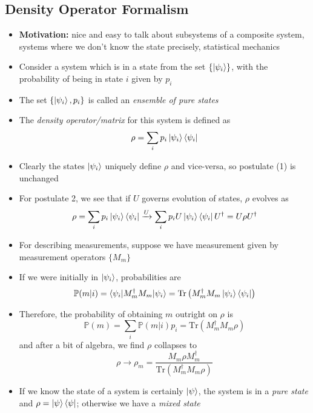 \documentclass[12pt,a4paper]{article}
\numberwithin{equation}{section}
\newcommand{\ketbra}[2]{\ket{#1}\bra{#2}}
\newcommand{\ketbras}[1]{\ketbra{#1}{#1}}
\begin{document}
	\subsection{Density Operator Formalism}
	\begin{itemize}
		\item \textbf{Motivation:} nice and easy to talk about subsystems of a composite system, systems where we don't know the state precisely, statistical mechanics
		\item Consider a system which is in a state from the set $\{\ket{\psi_{i}}\}$, with the probability of being in state $i$ given by $p_{i}$
		\item The set $\{\ket{\psi_{i}},p_{i}\}$ is called an \textit{ensemble of pure states}
		\item The \textit{density operator/matrix} for this system is defined as
		\begin{equation} \label{Density operator}
			\rho=\sum_{i}p_{i}\ket{\psi_{i}}\bra{\psi_{i}}
		\end{equation}
		\item Clearly the states $\ket{\psi_{i}}$ uniquely define $\rho$ and vice-versa, so postulate (1) is unchanged
		\item For postulate 2, we see that if $U$ governs evolution of states, $\rho$ evolves as
		\begin{equation} \label{Density operator evolution}
			\rho=\sum_{i}p_{i}\ketbras{\psi_{i}}\xrightarrow{U}\sum_{i}p_{i}U\ketbras{\psi_{i}}U^{\dagger}=U\rho U^{\dagger}
		\end{equation}
		\item For describing measurements, suppose we have measurement given by measurement operators $\{M_{m}\}$
		\item If we were initially in $\ket{\psi_{i}}$, probabilities are
		$$
			\mathbb{P}(m|i)=\braket{\psi_{i}|M_{m}^{\dagger}M_{m}|\psi_{i}}=\text{Tr}\left(M_{m}^{\dagger}M_{m}\ketbras{\psi_{i}}\right)
		$$
		\item Therefore, the probability of obtaining $m$ outright on $\rho$ is
		\begin{equation} \label{Density op measurement outcomes}
			\mathbb{P}(m)=\sum_{i}\mathbb{P}(m|i)p_{i}=\text{Tr}(M_{m}^{\dagger}M_{m}\rho)
		\end{equation}
		and after a bit of algebra, we find $\rho$ collapses to
		$$
			\rho\to \rho_{m}=\frac{M_{m}\rho M_{m}^{\dagger}}{\text{Tr}(M_{m}^{\dagger}M_{m}\rho)}
		$$
		\item If we know the state of a system is certainly $\ket{\psi}$, the system is in a \textit{pure state} and $\rho=\ketbras{\psi}$; otherwise we have a \textit{mixed state}

\end{itemize}
\end{document}
